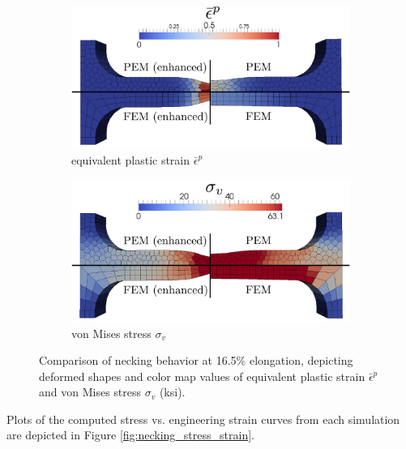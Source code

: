 \begin{figure}[!h]
  \centering
    \begin{subfigure}[b]{1.0\linewidth}
            \centering
            \includegraphics[width=6.0in]{figures/necking_comparison.pdf}
    			\caption{equivalent plastic strain $\bar{\epsilon}^p$ \label{fig:necking_eqps}}
    \end{subfigure}
	\begin{subfigure}[b]{1.0\linewidth}
            \centering
            \includegraphics[width=6.0in]{figures/necking_vonMises.pdf}
    			\caption{von Mises stress $\sigma_v$ \label{fig:necking_vonMises}}
    \end{subfigure} \caption{Comparison of necking behavior at 16.5\% elongation, depicting deformed shapes and color map values of equivalent plastic strain $\bar{\epsilon}^p$ and von Mises stress $\sigma_v$ (ksi).}
  \label{fig:necking_comparison}
\end{figure}

Plots of the computed stress vs. engineering strain curves from each simulation are depicted in Figure \ref{fig:necking_stress_strain}.


